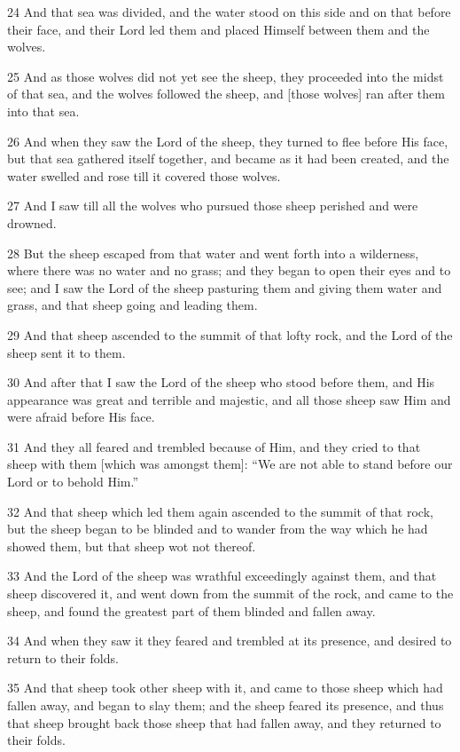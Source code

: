 \par 24 And that sea was divided, and the water stood on this side and on that before their face, and their Lord led them and placed Himself between them and the wolves.
\par 25 And as those wolves did not yet see the sheep, they proceeded into the midst of that sea, and the wolves followed the sheep, and [those wolves] ran after them into that sea.
\par 26 And when they saw the Lord of the sheep, they turned to flee before His face, but that sea gathered itself together, and became as it had been created, and the water swelled and rose till it covered those wolves.
\par 27 And I saw till all the wolves who pursued those sheep perished and were drowned.
\par 28 But the sheep escaped from that water and went forth into a wilderness, where there was no water and no grass; and they began to open their eyes and to see; and I saw the Lord of the sheep pasturing them and giving them water and grass, and that sheep going and leading them.
\par 29 And that sheep ascended to the summit of that lofty rock, and the Lord of the sheep sent it to them.
\par 30 And after that I saw the Lord of the sheep who stood before them, and His appearance was great and terrible and majestic, and all those sheep saw Him and were afraid before His face.
\par 31 And they all feared and trembled because of Him, and they cried to that sheep with them [which was amongst them]: “We are not able to stand before our Lord or to behold Him.”
\par 32 And that sheep which led them again ascended to the summit of that rock, but the sheep began to be blinded and to wander from the way which he had showed them, but that sheep wot not thereof.
\par 33 And the Lord of the sheep was wrathful exceedingly against them, and that sheep discovered it, and went down from the summit of the rock, and came to the sheep, and found the greatest part of them blinded and fallen away.
\par 34 And when they saw it they feared and trembled at its presence, and desired to return to their folds.
\par 35 And that sheep took other sheep with it, and came to those sheep which had fallen away, and began to slay them; and the sheep feared its presence, and thus that sheep brought back those sheep that had fallen away, and they returned to their folds.
